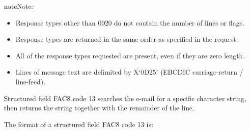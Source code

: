 \documentclass[letterpaper,10pt,english]{sphinxmanual}
\begin{document}

\begin{sphinxadmonition}{note}{Note:}\begin{itemize}
\item {} 
Response types other than 0020 do not contain the number of lines or flags.

\item {} 
Response types are returned in the same order as specified in the request.

\item {} 
All of the response types requested are present, even if they are zero length.

\item {} 
Lines of message text are delimited by X‘0D25’ (EBCDIC carriage-return / line-feed).

\end{itemize}
\end{sphinxadmonition}


Structured field FAC8 code 13 searches the e-mail for a specific character string, then returns the string together with
the remainder of the line.

The format of a structured field FAC8 code 13 is:

\begin{sphinxVerbatim}[commandchars=\\\{\}]
            
        
        
           
     
       
\end{sphinxVerbatim}
\end{document}
